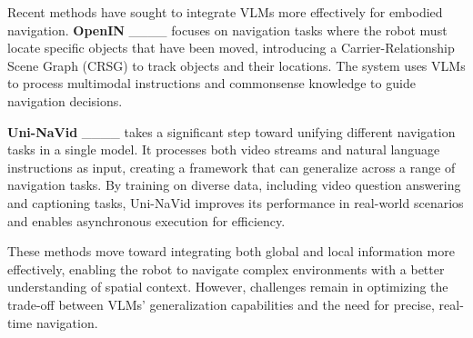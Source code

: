 Recent methods have sought to integrate VLMs more effectively for embodied navigation. \textbf{OpenIN} ____ focuses on navigation tasks where the robot must locate specific objects that have been moved, introducing a Carrier-Relationship Scene Graph (CRSG) to track objects and their locations. The system uses VLMs to process multimodal instructions and commonsense knowledge to guide navigation decisions.

\textbf{Uni-NaVid} ____ takes a significant step toward unifying different navigation tasks in a single model. It processes both video streams and natural language instructions as input, creating a framework that can generalize across a range of navigation tasks. By training on diverse data, including video question answering and captioning tasks, Uni-NaVid improves its performance in real-world scenarios and enables asynchronous execution for efficiency.

These methods move toward integrating both global and local information more effectively, enabling the robot to navigate complex environments with a better understanding of spatial context. However, challenges remain in optimizing the trade-off between VLMs’ generalization capabilities and the need for precise, real-time navigation.